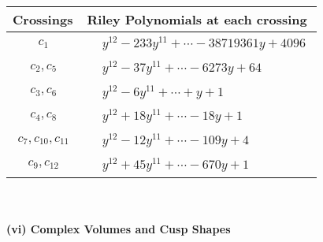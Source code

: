 \documentclass[1p]{elsarticle_modified}
\theoremstyle{definition}
\begin{document}
\begin{tabular}{m{50pt}|m{274pt}}
Crossings & \hspace{64pt}Riley Polynomials at each crossing \\
\hline $$\begin{aligned}c_{1}\end{aligned}$$&$\begin{aligned}
&y^{12}-233 y^{11}+\cdots-38719361 y+4096
\end{aligned}$\\
\hline $$\begin{aligned}c_{2},c_{5}\end{aligned}$$&$\begin{aligned}
&y^{12}-37 y^{11}+\cdots-6273 y+64
\end{aligned}$\\
\hline $$\begin{aligned}c_{3},c_{6}\end{aligned}$$&$\begin{aligned}
&y^{12}-6 y^{11}+\cdots+y+1
\end{aligned}$\\
\hline $$\begin{aligned}c_{4},c_{8}\end{aligned}$$&$\begin{aligned}
&y^{12}+18 y^{11}+\cdots-18 y+1
\end{aligned}$\\
\hline $$\begin{aligned}c_{7},c_{10},c_{11}\end{aligned}$$&$\begin{aligned}
&y^{12}-12 y^{11}+\cdots-109 y+4
\end{aligned}$\\
\hline $$\begin{aligned}c_{9},c_{12}\end{aligned}$$&$\begin{aligned}
&y^{12}+45 y^{11}+\cdots-670 y+1
\end{aligned}$\\
\hline
\end{tabular}\\~\\
\newpage\flushleft \textbf{(vi) Complex Volumes and Cusp Shapes}
\end{document}
